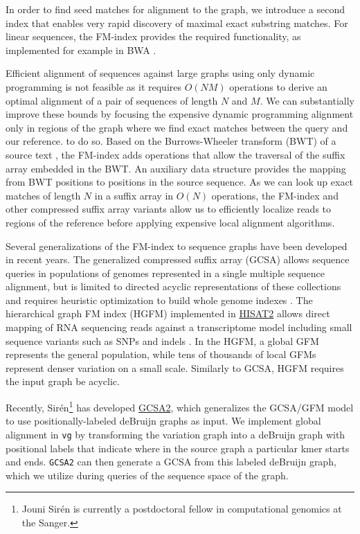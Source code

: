 \documentclass[12pt]{article}
\begin{document}
In order to find seed matches for alignment to the graph, we introduce a second index that enables very rapid discovery of maximal exact substring matches.  
For linear sequences, the FM-index \cite{fmindex2000, fmindex2005} provides the required functionality, as implemented for example in BWA \cite{li2013bwamem}.

Efficient alignment of sequences against large graphs using only dynamic programming is not feasible as it requires $O(NM)$ operations to derive an optimal alignment of a pair of sequences of length $N$ and $M$.
We can substantially improve these bounds by focusing the expensive dynamic programming alignment only in regions of the graph where we find exact matches between the query and our reference.
 to do so.
Based on the Burrows-Wheeler transform (BWT) of a source text \cite{burrowswheeler1994}, the FM-index adds operations that allow the traversal of the suffix array embedded in the BWT.
An auxiliary data structure provides the mapping from BWT positions to positions in the source sequence.
As we can look up exact matches of length $N$ in a suffix array in $O(N)$ operations, the FM-index and other compressed suffix array variants allow us to efficiently localize reads to regions of the reference before applying expensive local alignment algorithms.

Several generalizations of the FM-index to sequence graphs have been developed in recent years.
The generalized compressed suffix array (GCSA) allows sequence queries in populations of genomes represented in a single multiple sequence alignment, but is limited to directed acyclic representations of these collections and requires heuristic optimization to build whole genome indexes \cite{siren2011indexing, siren2014indexing}.
The hierarchical graph FM index (HGFM) implemented in \href{https://github.com/infphilo/hisat2}{HISAT2} allows direct mapping of RNA sequencing reads against a transcriptome model including small sequence variants such as SNPs and indels \cite{kim2015hisat}.
In the HGFM, a global GFM represents the general population, while tens of thousands of local GFMs represent denser variation on a small scale.
Similarly to GCSA, HGFM requires the input graph be acyclic.

Recently, Sirén\footnote{Jouni Sirén is currently a postdoctoral fellow in computational genomics at the Sanger.} has developed \href{https://github.com/jltsiren/gcsa2}{GCSA2}, which generalizes the GCSA/GFM model to use positionally-labeled deBruijn graphs as input.
We implement global alignment in {\tt vg} by transforming the variation graph into a deBruijn graph with positional labels that indicate where in the source graph a particular kmer starts and ends.
{\tt GCSA2} can then generate a GCSA from this labeled deBruijn graph, which we utilize during queries of the sequence space of the graph.
\end{document}
